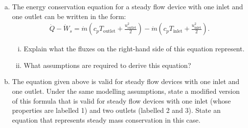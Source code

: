\documentclass[calculator,steamtables,refrigeranttables,psychrometricchart,datasheet,solutions]{exam}
\begin{document}
\begin{question}
\begin{enumerate}[(a)]
\end{enumerate}

%
\end{question}

\clearpage


\begin{question} 
\begin{enumerate}[(a)]
\item The energy conservation equation for a steady flow device with one inlet and one outlet can be written in the form:
\begin{align*}
 \dot{Q}-\dot{W}_{s} = \dot{m} \left(c_p T_\text{outlet} + \frac{u_{\text{outlet}}^2}{2}\right) - \dot{m} \left(c_p T_\text{inlet} + \frac{u_{\text{inlet}}^2}{2}\right).
\end{align*}
\begin{enumerate}[(i)]
\item Explain what the fluxes on the right-hand side of this equation represent. 
\item What assumptions are required to derive this equation? 
\end{enumerate}

\item The equation given above is valid for steady flow devices with one inlet and one outlet. Under the same modelling assumptions, state a modified version of this formula that is valid for steady flow devices with one inlet (whose properties are labelled 1) and two outlets (labelled 2 and 3). State an equation that represents steady mass conservation in this case. 
\end{enumerate}
\end{question}
\end{document}

